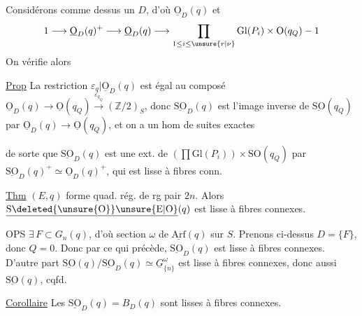 Considérons comme dessus un $D$, d'où
$\underline{\mathrm O}_D(q)$ et
\[
1\longrightarrow\underline{\mathrm O}_D(q)^+\longrightarrow\underline{\mathrm O}_D(q)\longrightarrow\prod_{1\leq i\leq\unsure{r|\nu}}\mathrm{Gl}(P_i)\times\mathrm O(q_Q)\mathbin{-}1
\]
On vérifie alors


\uline{Prop} La restriction $\varepsilon_q|\underline{\mathrm O}_D(q)$ est égal au composé $\underline{\mathrm O}_D(q)\longrightarrow\underline{\mathrm O}(q_Q)\xrightarrow{\varepsilon_{q_Q}}(\mathbb Z/2)_S$, donc $\underline{\mathrm{SO}}_D(q)$ est l'image inverse de $\underline{\mathrm{SO}}(q_Q)$ par $\underline{\mathrm O}_D(q)\longrightarrow\underline{\mathrm O}(q_Q)$, et on a un hom de suites exactes

de sorte que $\underline{\mathrm{SO}}_D(q)$ est une ext. de $(\prod\mathrm{Gl}(P_i))\times\mathrm{SO}(q_Q)$ par $\underline{\mathrm{SO}}_D(q)^+\simeq\underline{\mathrm O}_D(q)^+$, qui est lisse à fibres conn.

\uline{Thm} $(E,q)$ forme quad. rég. de rg pair $2n$. Alors $\underline{\mathrm S\deleted{\unsure{\mathrm O}}\unsure{\mathrm E|\mathrm O}}(q)$ est lisse à fibres connexes.

OPS $\exists\,F\subset G_n(q)$, d'où section $\omega$ de $\underline{\mathrm{Arf}}(q)$ sur $S$. Prenons ci-dessus $D=\{F\}$,  donc $Q=0$. Donc par ce qui précède, $\underline{\mathrm{SO}}_D(q)$ est lisse à fibres connexes.
D'autre part $\underline{\mathrm{SO}}(q)/\underline{\mathrm{SO}}_D(q)\simeq\underline G_{\{n\}}^\omega$ est lisse à fibres connexes, donc aussi $\underline{\mathrm{SO}}(q)$, cqfd.

\uline{Corollaire} Les $\underline{\mathrm{SO}}_D(q)=B_D(q)$ sont lisses à fibres connexes.
